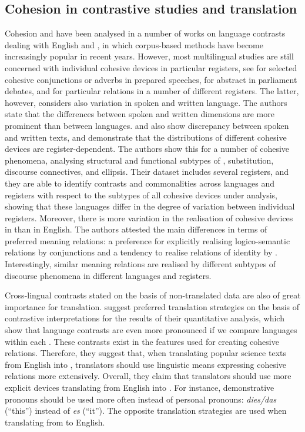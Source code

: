 \documentclass[output=paper]{langsci/langscibook.cls}
\begin{document}
\subsection{Cohesion in contrastive studies and translation}\label{sec:discourseEnDe}
Cohesion and  have been analysed in a number of works on language contrasts dealing with English and , in which corpus-based methods have become increasingly popular in recent years. However, most multilingual studies are still concerned with individual cohesive devices in particular registers, see \citet{BuehrigHouse2004}
for selected cohesive conjunctions or adverbs in prepared speeches, \citet{ZinsmeisterEtAl2012} for abstract  in parliament debates, and \citet{TaboadaGomezGonzalez2012} for particular  relations in a number of different registers. The latter, however, considers also variation in spoken and written language. The authors state that the differences between spoken and written dimensions are more prominent than between languages. \citet{KunzLapshinova2015} and \citet{SleGeccoForthcoming} also show discrepancy between spoken and written texts, and demonstrate that the distributions of different cohesive devices are register-dependent. The authors show this for a number of cohesive phenomena, analysing structural and functional subtypes of , substitution, discourse connectives, and ellipsis. Their dataset includes several registers, and they are able to identify contrasts and commonalities across languages and registers with respect to the subtypes of all cohesive devices under analysis, showing that these languages differ in the degree of variation between individual registers. Moreover, there is more variation in the realisation of cohesive devices in  than in English. The authors attested the main differences in terms of preferred meaning relations: a preference for explicitly realising logico-semantic relations by conjunctions and a tendency to realise relations of identity by . Interestingly, similar meaning relations are realised by different subtypes of discourse phenomena in different languages and registers.

Cross-lingual contrasts stated on the basis of non-translated data are also of great importance for translation. \citet{SleGeccoForthcoming} suggest preferred translation strategies on the basis of contrastive interpretations for the results of their quantitative analysis, which show that language contrasts are even more pronounced if we compare languages within each . These contrasts exist in the features used for creating cohesive relations. Therefore, they suggest that, when translating popular science texts from English into , translators should use linguistic means expressing cohesive relations more extensively. Overall, they claim that translators should use more explicit devices translating from English into . For instance, demonstrative pronouns should be used more often instead of personal pronouns:  \textsl{dies/das} (``this'') instead of  \textsl{es} (``it''). The opposite translation strategies are used when translating from  to English.
\end{document}
